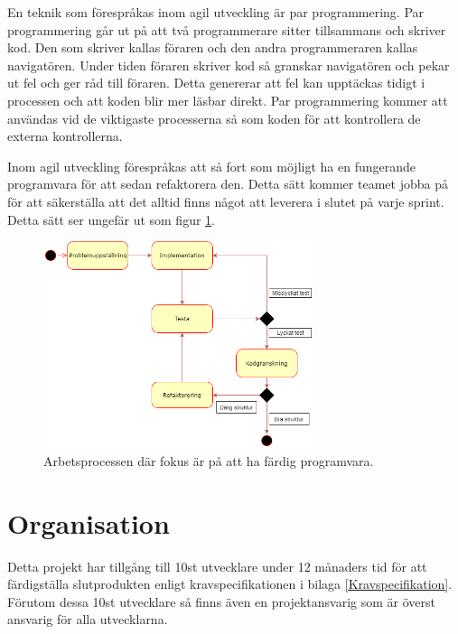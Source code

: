 \documentclass[a4paper,12pt,oneside,final]{extbook}
\begin{document}
En teknik som förespråkas inom agil utveckling är par programmering\cite{Sewell2012asd}. Par programmering går ut på att två programmerare sitter tillsammans och skriver kod. Den som skriver kallas föraren och den andra programmeraren kallas navigatören. Under tiden föraren skriver kod så granskar navigatören och pekar ut fel och ger råd till föraren. Detta genererar att fel kan upptäckas tidigt i processen och att koden blir mer läsbar direkt. Par programmering kommer att användas vid de viktigaste processerna så som koden för att kontrollera de externa kontrollerna. 

Inom agil utveckling förespråkas att så fort som möjligt ha en fungerande programvara för att sedan refaktorera den. Detta sätt kommer teamet jobba på för att säkerställa att det alltid finns något att leverera i slutet på varje sprint. Detta sätt ser ungefär ut som figur \ref{fig:refaktorering}.

\begin{figure}[h]
	\includegraphics[width=0.7\textwidth, center]{agil.png}
	\caption{Arbetsprocessen där fokus är på att ha färdig programvara.}
	\label{fig:refaktorering}
\end{figure}



\section{Organisation}


Detta projekt har tillgång till 10st utvecklare under 12 månaders tid för att färdigställa slutprodukten enligt kravspecifikationen i bilaga \ref{Kravspecifikation}. Förutom dessa 10st utvecklare så finns även en projektansvarig som är överst ansvarig för alla utvecklarna. 
\end{document}
